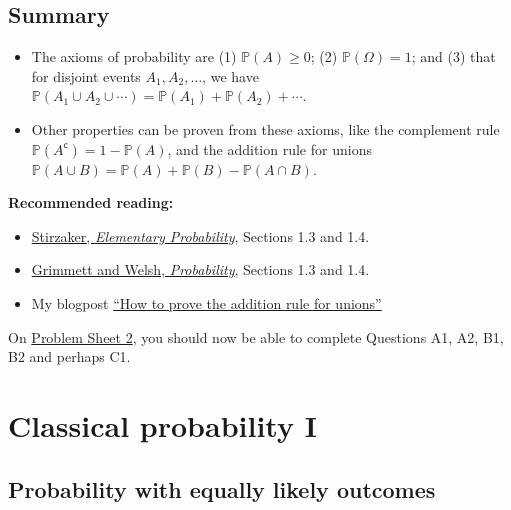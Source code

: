 \documentclass[
  a4paper,
]{book}
\providecommand{\tightlist}{%
  \setlength{\itemsep}{0pt}\setlength{\parskip}{0pt}}
\theoremstyle{definition}
\theoremstyle{definition}
\theoremstyle{definition}
\theoremstyle{definition}
\theoremstyle{remark}
\begin{document}
\hypertarget{summary-L04}{%
\section*{Summary}\label{summary-L04}}

\begin{itemize}
\tightlist
\item
  The axioms of probability are (1) \(\mathbb P(A) \geq 0\); (2) \(\mathbb P(\Omega) = 1\); and (3) that for disjoint events \(A_1, A_2, \dots\), we have \(\mathbb P(A_1 \cup A_2 \cup \cdots) = \mathbb P(A_1) + \mathbb P(A_2) + \cdots\).
\item
  Other properties can be proven from these axioms, like the complement rule \(\mathbb P(A^\mathsf{c}) = 1 - \mathbb P(A)\), and the addition rule for unions \(\mathbb P(A \cup B) = \mathbb P(A) + \mathbb P(B) - \mathbb P(A \cap B)\).
\end{itemize}

\textbf{Recommended reading:}

\begin{itemize}
\tightlist
\item
  \href{https://leeds.primo.exlibrisgroup.com/permalink/44LEE_INST/13rlbcs/alma991013131349705181}{Stirzaker, \emph{Elementary Probability}}, Sections 1.3 and 1.4.
\item
  \href{https://leeds.primo.exlibrisgroup.com/permalink/44LEE_INST/13rlbcs/alma991002938669705181}{Grimmett and Welsh, \emph{Probability}}, Sections 1.3 and 1.4.
\item
  My blogpost \href{https://mpaldridge.github.io/blog/union.html}{``How to prove the addition rule for unions''}
\end{itemize}

On \protect\hyperlink{P2}{Problem Sheet 2}, you should now be able to complete Questions A1, A2, B1, B2 and perhaps C1.

\hypertarget{L05-classical-i}{%
\chapter{Classical probability I}\label{L05-classical-i}}

\hypertarget{classical-intro}{%
\section{Probability with equally likely outcomes}\label{classical-intro}}
\end{document}
